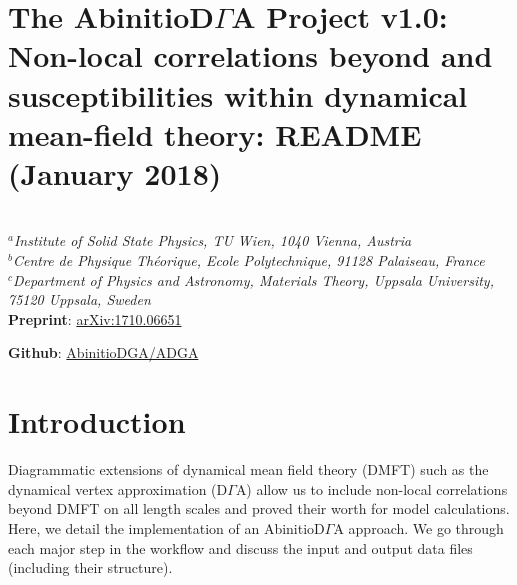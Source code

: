 \documentclass[a4paper,11pt]{article}
\numberwithin{equation}{section} %
\begin{document}
\section*{The AbinitioD$\Gamma$A Project v1.0: Non-local correlations beyond and susceptibilities within dynamical mean-field theory: README (January 2018)}
\begin{framed}
\\
\center\textit{{$^a$Institute of Solid State Physics, TU Wien, 1040 Vienna, Austria\\
$^b$Centre de Physique Théorique, Ecole Polytechnique, 91128 Palaiseau, France\\
$^c$Department of Physics and Astronomy, Materials Theory, Uppsala University, 75120 Uppsala, Sweden}}
\\[1\baselineskip]
\textbf{Preprint}: \href{https://arxiv.org/abs/1710.06651}{arXiv:1710.06651}

\textbf{Github}: \href{https://github.com/AbinitioDGA/ADGA}{AbinitioDGA/ADGA}
\end{framed}

\section{Introduction}
Diagrammatic extensions of dynamical mean field theory (DMFT) such as the dynamical vertex approximation (D$\Gamma$A) allow us to include non-local correlations beyond DMFT on all length scales and proved their worth for model calculations. Here, we detail the implementation of an AbinitioD$\Gamma$A approach. We go through each major step in the workflow and discuss the input and output data files (including their structure).

\end{document}
